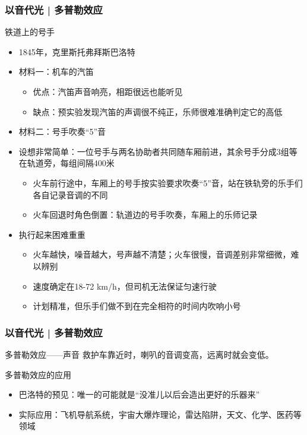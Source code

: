 \begin{frame}
  \frametitle{以音代光 | 多普勒效应}
  \begin{block}{铁道上的号手}
    \begin{itemize}
      \item 1845年，克里斯托弗\textbullet 拜斯\textbullet 巴洛特
      \item 材料一：机车的汽笛
        \begin{itemize}
          \item 优点：汽笛声音响亮，相距很远也能听见
          \item 缺点：预实验发现汽笛的声调很不纯正，乐师很难准确判定它的高低
        \end{itemize}
      \item 材料二：号手吹奏“5”音
      \item 设想非常简单：一位号手与两名协助者共同随车厢前进，其余号手分成3组等在轨道旁，每组间隔400米 
        \begin{itemize}
          \item 火车前行途中，车厢上的号手按实验要求吹奏“5”音，站在铁轨旁的乐手们各自记录音调的不同
          \item 火车回退时角色倒置：轨道边的号手吹奏，车厢上的乐师记录
        \end{itemize}
      \item 执行起来困难重重
        \begin{itemize}
          \item 火车越快，噪音越大，号声越不清楚；火车很慢，音调差别非常细微，难以辨别
          \item 速度确定在18-72 km/h，但司机无法保证匀速行驶
          \item 计划精准，但乐手们做不到在完全相符的时间内吹响小号
        \end{itemize}
    \end{itemize}
  \end{block}
\end{frame}

\begin{frame}
  \frametitle{以音代光 | 多普勒效应}
  \begin{block}{多普勒效应——声音}
    救护车靠近时，喇叭的音调变高，远离时就会变低。
  \end{block}
  \pause
  \begin{block}{多普勒效应的应用}
    \begin{itemize}
      \item 巴洛特的预见：唯一的可能就是“没准儿以后会造出更好的乐器来”
      \item 实际应用：飞机导航系统，宇宙大爆炸理论，雷达陷阱，天文、化学、医药等领域
    \end{itemize}
  \end{block}
\end{frame}

